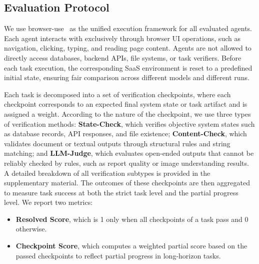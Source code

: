 \subsection{Evaluation Protocol}
\label{saas-eval}

We use browser-use~\cite{browseruse} as the unified execution framework for all evaluated agents. Each agent interacts with \datasetname exclusively through browser UI operations, such as navigation, clicking, typing, and reading page content. Agents are not allowed to directly access databases, backend APIs, file systems, or task verifiers. Before each task execution, the corresponding SaaS environment is reset to a predefined initial state, ensuring fair comparison across different models and different runs.

Each task is decomposed into a set of verification checkpoints, where each checkpoint corresponds to an expected final system state or task artifact and is assigned a weight. According to the nature of the checkpoint, we use three types of verification methods: \textbf{State-Check}, which verifies objective system states such as database records, API responses, and file existence; \textbf{Content-Check}, which validates document or textual outputs through structural rules and string matching; and \textbf{LLM-Judge}, which evaluates open-ended outputs that cannot be reliably checked by rules, such as report quality or image understanding results. A detailed breakdown of all verification subtypes is provided in the supplementary material. The outcomes of these checkpoints are then aggregated to measure task success at both the strict task level and the partial progress level. We report two metrics:
\begin{itemize}[leftmargin=1.5em]
    \item \textbf{Resolved Score}, which is 1 only when all checkpoints of a task pass and 0 otherwise.
    \item \textbf{Checkpoint Score}, which computes a weighted partial score based on the passed checkpoints to reflect partial progress in long-horizon tasks.
\end{itemize}
